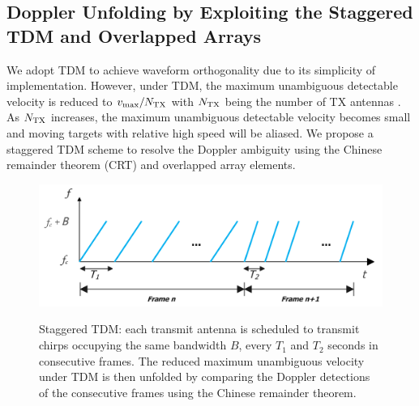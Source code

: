 \documentclass[conference]{IEEEtran}
\begin{document}
\subsection{Doppler Unfolding by Exploiting the Staggered TDM and Overlapped Arrays}
We adopt TDM to achieve waveform orthogonality due to its simplicity of implementation.
However, under TDM, the maximum unambiguous detectable velocity is reduced to $v_{\max}/N_{\rm TX}$ with $N_{\rm TX}$ being the number of TX antennas \cite{SUN_SPM_Feature_Article_2020}. As $N_{\rm TX}$ increases, the  maximum unambiguous detectable velocity  becomes small and moving targets with relative high speed will be aliased.  We propose a staggered TDM scheme to resolve the Doppler ambiguity using the Chinese remainder theorem (CRT) and overlapped array elements.

\vspace{-3mm}
\begin{figure}[h]%
\centering
{\includegraphics[width=3.3 in]{fig/Staggered_TDM.pdf}}
\vspace{-2mm}
\caption{Staggered TDM: each transmit antenna is scheduled to transmit  chirps occupying the same bandwidth $B$, every $T_1$ and $T_2$ seconds in consecutive frames. The reduced maximum unambiguous velocity under TDM is then unfolded  by comparing the Doppler detections of the consecutive frames using the Chinese remainder theorem.
}
\label{fig_staggered_TDM}
\vspace{-2mm}
\end{figure} 
\end{document}
